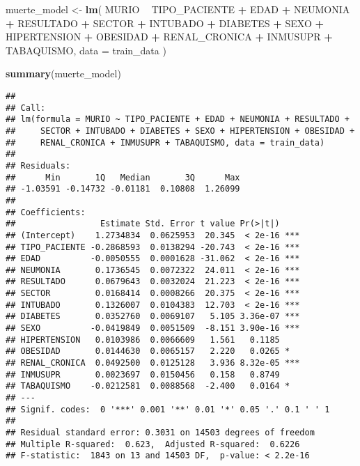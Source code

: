 \documentclass[]{article}
\newenvironment{Shaded}{\begin{snugshade}}{\end{snugshade}}
\newcommand{\DataTypeTok}[1]{\textcolor[rgb]{0.13,0.29,0.53}{#1}}
\newcommand{\KeywordTok}[1]{\textcolor[rgb]{0.13,0.29,0.53}{\textbf{#1}}}
\newcommand{\NormalTok}[1]{#1}
\newcommand{\OperatorTok}[1]{\textcolor[rgb]{0.81,0.36,0.00}{\textbf{#1}}}
\newcommand{\StringTok}[1]{\textcolor[rgb]{0.31,0.60,0.02}{#1}}
\begin{document}
\begin{Shaded}
\begin{Highlighting}[]
\NormalTok{muerte_model <-}
\StringTok{  }\KeywordTok{lm}\NormalTok{(}
\NormalTok{    MURIO }\OperatorTok{~}\StringTok{ }\NormalTok{TIPO_PACIENTE }\OperatorTok{+}\StringTok{ }\NormalTok{EDAD }\OperatorTok{+}\StringTok{ }\NormalTok{NEUMONIA }\OperatorTok{+}\StringTok{ }\NormalTok{RESULTADO }\OperatorTok{+}\StringTok{ }\NormalTok{SECTOR }\OperatorTok{+}\StringTok{ }\NormalTok{INTUBADO }\OperatorTok{+}\StringTok{ }\NormalTok{DIABETES }\OperatorTok{+}\StringTok{ }\NormalTok{SEXO }\OperatorTok{+}\StringTok{ }\NormalTok{HIPERTENSION }\OperatorTok{+}\StringTok{ }\NormalTok{OBESIDAD }\OperatorTok{+}\StringTok{ }\NormalTok{RENAL_CRONICA }\OperatorTok{+}\StringTok{ }\NormalTok{INMUSUPR }\OperatorTok{+}\StringTok{ }\NormalTok{TABAQUISMO,}
    \DataTypeTok{data =}\NormalTok{ train_data}
\NormalTok{  )}

\KeywordTok{summary}\NormalTok{(muerte_model)}
\end{Highlighting}
\end{Shaded}

\begin{verbatim}
## 
## Call:
## lm(formula = MURIO ~ TIPO_PACIENTE + EDAD + NEUMONIA + RESULTADO + 
##     SECTOR + INTUBADO + DIABETES + SEXO + HIPERTENSION + OBESIDAD + 
##     RENAL_CRONICA + INMUSUPR + TABAQUISMO, data = train_data)
## 
## Residuals:
##      Min       1Q   Median       3Q      Max 
## -1.03591 -0.14732 -0.01181  0.10808  1.26099 
## 
## Coefficients:
##                 Estimate Std. Error t value Pr(>|t|)    
## (Intercept)    1.2734834  0.0625953  20.345  < 2e-16 ***
## TIPO_PACIENTE -0.2868593  0.0138294 -20.743  < 2e-16 ***
## EDAD          -0.0050555  0.0001628 -31.062  < 2e-16 ***
## NEUMONIA       0.1736545  0.0072322  24.011  < 2e-16 ***
## RESULTADO      0.0679643  0.0032024  21.223  < 2e-16 ***
## SECTOR         0.0168414  0.0008266  20.375  < 2e-16 ***
## INTUBADO       0.1326007  0.0104383  12.703  < 2e-16 ***
## DIABETES       0.0352760  0.0069107   5.105 3.36e-07 ***
## SEXO          -0.0419849  0.0051509  -8.151 3.90e-16 ***
## HIPERTENSION   0.0103986  0.0066609   1.561   0.1185    
## OBESIDAD       0.0144630  0.0065157   2.220   0.0265 *  
## RENAL_CRONICA  0.0492500  0.0125128   3.936 8.32e-05 ***
## INMUSUPR       0.0023697  0.0150456   0.158   0.8749    
## TABAQUISMO    -0.0212581  0.0088568  -2.400   0.0164 *  
## ---
## Signif. codes:  0 '***' 0.001 '**' 0.01 '*' 0.05 '.' 0.1 ' ' 1
## 
## Residual standard error: 0.3031 on 14503 degrees of freedom
## Multiple R-squared:  0.623,  Adjusted R-squared:  0.6226 
## F-statistic:  1843 on 13 and 14503 DF,  p-value: < 2.2e-16
\end{verbatim}
\end{document}

